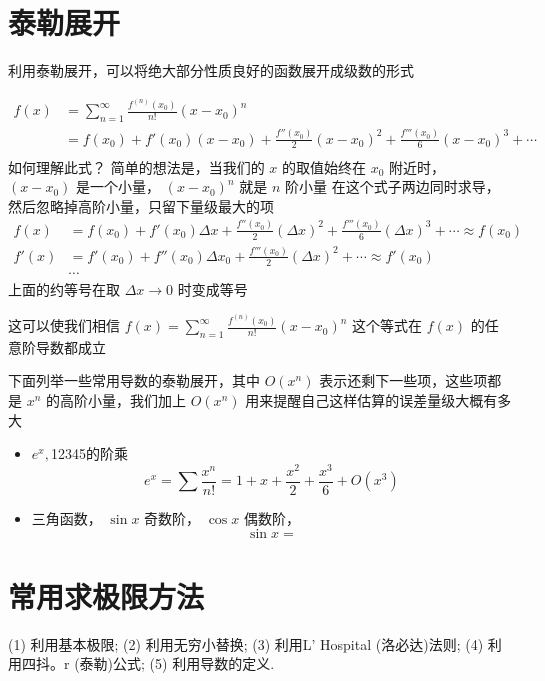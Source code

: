 \documentclass[lang=cn,newtx,10pt,scheme=chinese]{elegantbook}
\begin{document}
\section{泰勒展开}

利用泰勒展开，可以将绝大部分性质良好的函数展开成级数的形式

\begin{equation}
  \begin{aligned}
  f(x)&=\sum_{n=1}^{\infty } \frac{f^{(n)}(x_0)}{n!} (x-x_0)^{n}\\
  &=f(x_0)+f'(x_0)(x-x_0)+\frac{f''(x_0)}{2} (x-x_0)^{2}+\frac{f'''(x_0)}{6}(x-x_0)^{3}+ \cdots \\
  \end{aligned} 
\end{equation}
如何理解此式？
简单的想法是，当我们的 $x$ 的取值始终在 $x_0$ 附近时， $(x-x_0)$ 是一个小量， $(x-x_0)^{n}$ 就是 $n$ 阶小量
在这个式子两边同时求导，然后忽略掉高阶小量，只留下量级最大的项
  \begin{equation}
  \begin{aligned}
  f(x)&=f(x_0)+f'(x_0)\Delta x+\frac{f''(x_0)}{2} (\Delta x)^{2}+\frac{f'''(x_0)}{6}(\Delta x)^{3}+ \cdots \approx f(x_0) \\
  f'(x)&=f'(x_0)+f''(x_0)\Delta x_0+\frac{f'''(x_0)}{2}(\Delta x)^{2}+ \cdots \approx f'(x_0)\\
  &\cdots
  \end{aligned} 
\end{equation}
上面的约等号在取 $\Delta x\to 0$ 时变成等号

这可以使我们相信 $f(x)=\sum_{n=1}^{\infty } \frac{f^{(n)}(x_0)}{n!} (x-x_0)^{n}$ 这个等式在 $f(x)$ 的任意阶导数都成立

下面列举一些常用导数的泰勒展开，其中 $O(x^{n})$ 表示还剩下一些项，这些项都是 $x^{n}$ 的高阶小量，我们加上 $O(x^{n})$ 用来提醒自己这样估算的误差量级大概有多大

\begin{itemize}
  \item $e^{x},$12345的阶乘 \begin{equation}
    e^{x}=\sum \frac{x^{n}}{n!} =1+x+\frac{x^{2}}{2}+\frac{x^{3}}{6}+ O(x^{3})
  \end{equation}
  \item 三角函数， $\sin x$ 奇数阶， $\cos x$ 偶数阶，
  \begin{equation}
    \sin x=
  \end{equation}
\end{itemize}
\section{常用求极限方法}
(1) 利用基本极限;
(2) 利用无穷小替换;
(3) 利用L' Hospital (洛必达)法则;
(4) 利用四抖。r (泰勒)公式;
(5) 利用导数的定义.
\end{document}
